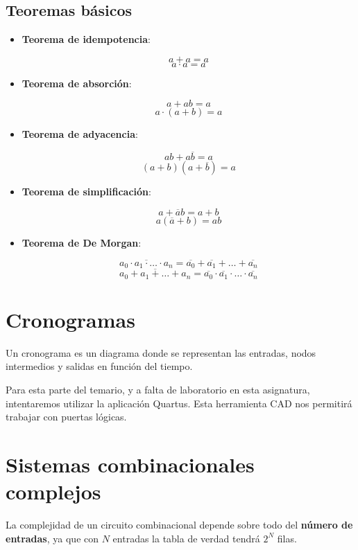 \documentclass[a4paper]{book}
\begin{document}
\subsection{Teoremas básicos}

\begin{itemize}
\item \textbf{Teorema de idempotencia}: 
\begin{multicols}{2}
\[\boxed{a + a = a }\]
\[\boxed{ a \cdot  a = a}\]
\end{multicols}
\item \textbf{Teorema de absorción}:
\begin{multicols}{2}
\[\boxed{a + ab = a}\]
\[\boxed{ a \cdot  (a+b) = a}\]
\end{multicols}
\item \textbf{Teorema de adyacencia}:
\begin{multicols}{2}
\[\boxed{ab + a\overline{b} = a}\]
\[\boxed{ (a+b)(a+\overline{b}) = a}\]
\end{multicols}
\item \textbf{Teorema de simplificación}:
\begin{multicols}{2}
\[\boxed{a + \overline{a}b = a + b}\]
\[\boxed{ a (\overline{a}+b) = ab}\]
\end{multicols}
\item \textbf{Teorema de De Morgan}: 
\begin{multicols}{2}
\[\boxed{\overline{a_0 \cdot a_1\cdot \ldots \cdot a_n} = \overline{a_0} + \overline{a_1} + \ldots + \overline{a_n}}\]
\[\boxed{ \overline{a_0 + a_1+ \ldots + a_n} = \overline{a_0} \cdot  \overline{a_1} \cdot  \ldots \cdot  \overline{a_n} }\]
\end{multicols}
\end{itemize}

\section{Cronogramas}
Un cronograma es un diagrama donde se representan las entradas, nodos intermedios y salidas en función del tiempo.

Para esta parte del temario, y a falta de laboratorio en esta asignatura, intentaremos utilizar la aplicación Quartus. Esta herramienta CAD nos permitirá trabajar con puertas lógicas.


\section{Sistemas combinacionales complejos}
La complejidad de un circuito combinacional depende sobre todo del \textbf{número de entradas}, ya que con $N$ entradas la tabla de verdad tendrá $2^N$ filas.
\end{document}
